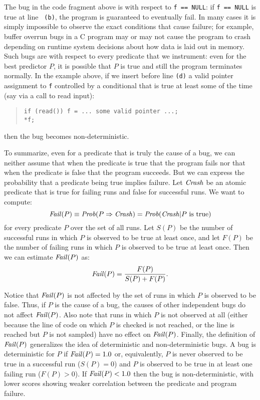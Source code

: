 The bug in the code fragment above is  with
respect to {\tt f == NULL}: if {\tt f == NULL} is true at line {\tt
(b)}, the program is guaranteed to eventually fail.  In many cases it
is simply impossible to observe the exact conditions that cause
failure; for example, buffer overrun bugs in a C program may or may
not cause the program to crash depending on runtime system decisions
about how data is laid out in memory.  Such bugs are
 with respect to every predicate that we instrument:
even for the best predictor $P$, it is possible that $P$ is true and
still the program terminates normally.  In the example above, if we insert before line
{\tt (d)} a valid pointer  assignment to {\tt f} controlled by a conditional that is true
at least some of the time (say via a call to read input):
\begin{quote}
\begin{verbatim}
if (read()) f = ... some valid pointer ...;
*f;
\end{verbatim}
\end{quote}
then the bug becomes non-deterministic.

To summarize, even for a predicate that is truly the cause of a bug, we can neither assume that
when the predicate is true that
the program fails nor that when the predicate is false that
the program succeeds. But we can express the probability that a predicate
being true implies failure.  Let $\mbox{\textit{Crash}}$ be an atomic predicate that is
true for failing runs and false for successful runs.  We want to compute:
\[ \mbox{\textit{Fail}}(P) \equiv \mbox{\textit{Prob}}(P \Rightarrow \mbox{\textit{Crash}}) = \mbox{\textit{Prob}}(\mbox{\textit{Crash}} | P \mbox{ is true}) \]
for every predicate $P$ over the set of all runs.  Let $S(P)$ be the number
of successful runs in which $P$ is observed to be true at least once, and let $F(P)$ be the number of
failing runs in which $P$ is observed to be true at least once.  Then we can
estimate $\mbox{\textit{Fail}}(P)$ as:
\[ \mbox{\textit{Fail}}(P) = \frac{F(P)}{S(P) + F(P)} . \]

Notice that $\mbox{\textit{Fail}}(P)$ is not affected by the set of runs in which
$P$ is observed to be false.  Thus, if $P$ is the cause of a bug, the
causes of other independent bugs do not affect $\mbox{\textit{Fail}}(P)$.
Also note that runs in which $P$ is not observed at all (either because
the line of code on which $P$ is checked is not reached, or the line is reached
but $P$ is not sampled) have no effect on $\mbox{\textit{Fail}}(P)$.
Finally, the definition of $\mbox{\textit{Fail}}(P)$
generalizes the idea of deterministic and non-deterministic bugs.  A
bug is deterministic for $P$ if $\mbox{\textit{Fail}}(P) = 1.0$ or, equivalently,
$P$ is never observed to be true in a successful run ($S(P) =
0$) and $P$ is observed to be true in at least one failing run ($F(P) > 0$).
If $\mbox{\textit{Fail}}(P) < 1.0$ then the bug is non-deterministic, with
lower scores showing weaker correlation between the predicate and
program failure.

